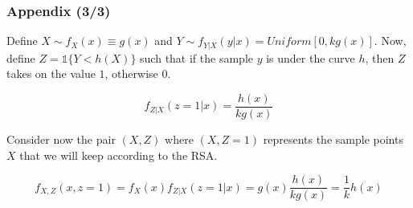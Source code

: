 \documentclass{beamer}
\begin{document}
\begin{frame}
\frametitle{Appendix (3/3)}
Define $X \sim f_X(x)\equiv g(x)$ and $Y \sim f_{Y|X}(y|x)=Uniform[0,kg(x)]$.
Now, define $Z=\mathbb{1}\{Y<h(X)\}$ such that if the sample $y$ is under the curve $h$, then $Z$ takes on the value $1$, otherwise $0$.

$$f_{Z|X}(z=1|x)=\frac{h(x)}{kg(x)}$$

Consider now the pair $(X,Z)$ where $(X,Z=1)$ represents the sample points $X$ that we will keep according to the RSA.

$$f_{X,Z}(x,z=1)=f_X(x)f_{Z|X}(z=1|x)=g(x)\frac{h(x)}{kg(x)}=\frac{1}{k}h(x)$$ 

\end{frame}
\end{document}
